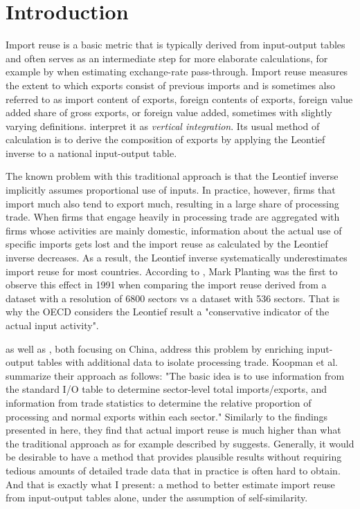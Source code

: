 \documentclass[english]{uzhpub}
\begin{document}
\section{Introduction}
Import reuse is a basic metric that is typically derived from input-output tables and often serves as an intermediate step for more elaborate calculations, for example by \cite{auer2016international} when estimating exchange-rate pass-through. Import reuse measures the extent to which exports consist of previous imports and is sometimes also referred to as import content of exports, foreign contents of exports, foreign value added share of gross exports, or foreign value added, sometimes with slightly varying definitions. \cite{hummels2001nature} interpret it as \emph{vertical integration}. Its usual method of calculation is to derive the composition of exports by applying the Leontief inverse to a national input-output table.

The known problem with this traditional approach is that the Leontief inverse implicitly assumes proportional use of inputs. In practice, however, firms that import much also tend to export much, resulting in a large share of processing trade. \citep{amiti2012importers} When firms that engage heavily in processing trade are aggregated with firms whose activities are mainly domestic, information about the actual use of specific imports gets lost and the import reuse as calculated by the Leontief inverse decreases. As a result, the Leontief inverse systematically underestimates import reuse for most countries. According to \cite{oecd2000}, Mark Planting was the first to observe this effect in 1991 when comparing the import reuse derived from a dataset with a resolution of 6800 sectors vs a dataset with 536 sectors. That is why the OECD considers the Leontief result a "conservative indicator of the actual input activity".

\cite{koopman2012estimating} as well as \cite{kee2013domestic}, both focusing on China, address this problem by enriching input-output tables with additional data to isolate processing trade. Koopman et al. summarize their approach as follows: "The basic idea is to use information from the standard I/O table to determine sector-level total imports/exports, and information from trade statistics to determine the relative proportion of processing and normal exports within each sector." Similarly to the findings presented in here, they find that actual import reuse is much higher than what the traditional approach as for example described by \cite{hummels2001nature} suggests. Generally, it would be desirable to have a method that provides plausible results without requiring tedious amounts of detailed trade data that in practice is often hard to obtain. And that is exactly what I present: a method to better estimate import reuse from input-output tables alone, under the assumption of self-similarity.
\end{document}
